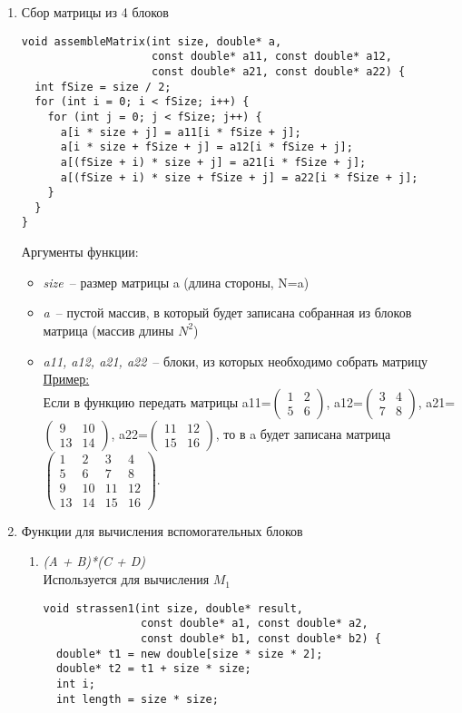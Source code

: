 \documentclass{report}
\begin{document}
\begin{center}
\begin{enumerate}
\begin{itemize}
\end{itemize}
\item Сбор матрицы из 4 блоков
\begin{lstlisting}
void assembleMatrix(int size, double* a,
                    const double* a11, const double* a12,
                    const double* a21, const double* a22) {
  int fSize = size / 2;
  for (int i = 0; i < fSize; i++) {
    for (int j = 0; j < fSize; j++) {
      a[i * size + j] = a11[i * fSize + j];
      a[i * size + fSize + j] = a12[i * fSize + j];
      a[(fSize + i) * size + j] = a21[i * fSize + j];
      a[(fSize + i) * size + fSize + j] = a22[i * fSize + j];
    }
  }
}
\end{lstlisting}
\par Аргументы функции:
\begin{itemize}
\item \textit{size}~-- размер матрицы a (длина стороны, N=a)
\item \textit{a}~-- пустой массив, в который будет записана собранная из блоков матрица (массив длины $N^2$)
\item \textit{a11, a12, a21, a22}~-- блоки, из которых необходимо собрать матрицу
\underline{Пример:}\\
Если в функцию передать матрицы a11=$\begin{pmatrix}1 & 2 \\ 5 & 6\end{pmatrix}$, a12=$\begin{pmatrix}3 & 4 \\7 & 8\end{pmatrix}$, a21=$\begin{pmatrix}9 & 10 \\ 13 & 14\end{pmatrix}$, a22=$\begin{pmatrix}11 & 12 \\ 15 & 16\end{pmatrix}$, то в a будет записана матрица \\
$\begin{pmatrix}1 & 2 & 3 & 4 \\ 5 & 6 & 7 & 8 \\ 9 & 10 & 11 & 12 \\ 13 & 14 & 15 & 16\end{pmatrix}$.
\end{itemize}

\item Функции для вычисления вспомогательных блоков
\begin{enumerate}[label*=\arabic*.]
\item \textit{(A + B)*(C + D)}\\
Используется для вычисления $M_1$
\begin{lstlisting}
void strassen1(int size, double* result,
               const double* a1, const double* a2,
               const double* b1, const double* b2) {
  double* t1 = new double[size * size * 2];
  double* t2 = t1 + size * size;
  int i;
  int length = size * size;


\end{lstlisting}
\end{enumerate}
\end{enumerate}
\end{center}
\end{document}
